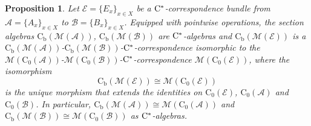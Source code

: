 \documentclass[11 pt, leqno]{amsart}
\numberwithin{equation}{section}
\theoremstyle{plain}
\newtheorem {prop}[thm] {Proposition}
\theoremstyle{definition}
\newcommand*{\contz}{\mathrm{C_0}}%
\newcommand*{\contb}{\mathrm{C_b}}%
\newcommand{\B}{\mathcal B}
\newcommand{\M}{\mathcal M}
\newcommand{\EE}{\mathcal E}
\newcommand{\A}{\mathcal A}
\newcommand{\cst}{\ifmmode\mathrm{C}^*\else{$\mathrm{C}^*$}\fi}
\begin{document}
\begin{prop}\label{prop:Akemman_Pedersen_Tomiyama_generalization}
Let $\EE=\{E_x\}_{x\in X}$ be a $\cst$-correspondence bundle from $\A=\{A_x\}_{x\in X}$ to $\B=\{B_x\}_{x\in X}$. 
Equipped with pointwise operations, the section algebras $\contb(\M(\A))$, $\contb(\M(\B))$ are $\cst$-algebras and $\contb(\M(\EE))$ is a  $\contb(\M(\A))$-$\contb(\M(\B))$-$\cst$-correspondence isomorphic to the $\M(\contz(\A))$-$\M(\contz(\B))$-$\cst$-correspondence $\M(\contz(\EE))$, where the isomorphism
\[
    \contb(\M(\EE))\cong \M(\contz(\EE))
\]
is the unique morphism that extends the identities on $\contz(\EE)$, $\contz(\A)$ and $\contz(\B)$. 
In particular, $\contb(\M(\A))\cong \M(\contz(\A))$ and $\contb(\M(\B))\cong \M(\contz(\B))$ as $\cst$-algebras. %
\end{prop}
\end{document}
